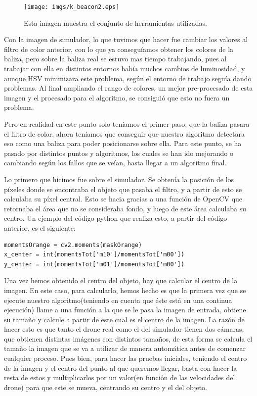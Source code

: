 \begin{figure}[ht]
	\centering
		\texttt{[image: imgs/k\_beacon2.eps]}
		\caption{Esta imagen muestra el conjunto de herramientas utilizadas.}
	\label{fig:Herramientas}
\end{figure}

\hspace{1 cm} Con la imagen de simulador, lo que tuvimos que hacer fue cambiar los valores al filtro de color anterior, con lo que ya consegu\'iamos obtener los colores de la baliza, pero sobre la baliza real se estuvo mas tiempo trabajando, pues al trabajar con ella en distintos entornos hab\'ia muchos cambios de luminosidad, y aunque HSV minimizara este problema, seg\'un el entorno de trabajo segu\'ia dando problemas. Al final ampliando el rango de colores, un mejor pre-procesado de esta imagen y el procesado para el algoritmo, se consigui\'o que esto no fuera un problema. 

\hspace{1 cm} Pero en realidad en este punto solo ten\'iamos el primer paso, que la baliza pasara el filtro de color, ahora ten\'iamos que conseguir que nuestro algoritmo detectara eso como una baliza para poder posicionarse sobre ella. Para este punto, se ha pasado por distintos puntos y algoritmos, los cuales se han ido mejorando o cambiando seg\'un los fallos que se ve\'ian, hasta llegar a un algoritmo final.

\hspace{1 cm} Lo primero que hicimos fue sobre el simulador. Se obten\'ia la posici\'on de los p\'ixeles donde se encontraba el objeto que pasaba el filtro, y a partir de esto se calculaba su p\'ixel central. Esto se hacia gracias a una funci\'on de OpenCV que retornaba el \'area que no se consideraba fondo, y luego de este \'area calculaba su centro. Un ejemplo del c\'odigo python que realiza esto, a partir del c\'odigo anterior, es el siguiente:

\begin{verbatim}
momentsOrange = cv2.moments(maskOrange)
x_center = int(momentsTot['m10']/momentsTot['m00'])
y_center = int(momentsTot['m01']/momentsTot['m00'])
\end{verbatim}

\hspace{1cm} Una vez hemos obtenido el centro del objeto, hay que calcular el centro de la imagen. En este caso, para calcularlo, hemos hecho es que la primera vez que se ejecute nuestro algoritmo(teniendo en cuenta que \'este est\'a en una continua ejecuci\'on) llame a una funci\'on a la que se le pasa la imagen de entrada, obtiene su tamaño y calcule a partir de este cual es el centro de la imagen. La raz\'on de hacer esto es que tanto el drone real como el del simulador tienen dos c\'amaras, que obtienen distintas im\'agenes con distintos tamaños, de esta forma se calcula el tamaño la imagen que se va a utilizar de manera autom\'atica antes de comenzar cualquier proceso. Pues bien, para hacer las pruebas iniciales, teniendo el centro de la imagen y el centro del punto al que queremos llegar, basta con hacer la resta de estos y multiplicarlos por un valor(en funci\'on de las velocidades del drone) para que este se mueva, centrando su centro y el del objeto. 

